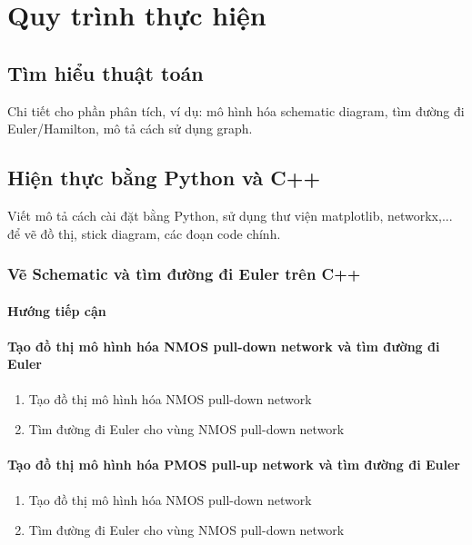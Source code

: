 \documentclass[a4paper,12pt]{article}
\begin{document}
\section{Quy trình thực hiện}

\subsection{Tìm hiểu thuật toán}
Chi tiết cho phần phân tích, ví dụ: mô hình hóa schematic diagram, tìm đường đi Euler/Hamilton, mô tả cách sử dụng graph.
\subsection{Hiện thực bằng Python và C++}
Viết mô tả cách cài đặt bằng Python, sử dụng thư viện matplotlib, networkx,... để vẽ đồ thị, stick diagram, các đoạn code chính.
\subsubsection{Vẽ Schematic và tìm đường đi Euler trên C++}
\paragraph{Hướng tiếp cận}
\paragraph{Tạo đồ thị mô hình hóa NMOS pull-down network và tìm đường đi Euler}
\begin{enumerate}[label=\alph*.]
    \item{Tạo đồ thị mô hình hóa NMOS pull-down network}
    \item{Tìm đường đi Euler cho vùng NMOS pull-down network}
\end{enumerate}
\paragraph{Tạo đồ thị mô hình hóa PMOS pull-up network và tìm đường đi Euler}
\begin{enumerate}[label=\alph*.]
    \item{Tạo đồ thị mô hình hóa NMOS pull-down network}
    \item{Tìm đường đi Euler cho vùng NMOS pull-down network}
\end{enumerate}
\end{document}
